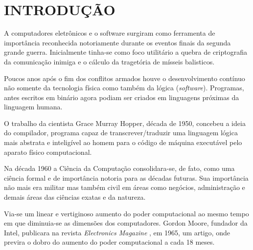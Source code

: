 


\section{\textbf{INTRODUÇÃO}}
    \label{sec:introdução}



    A computadores eletrônicos e o software surgiram como ferramenta de importância
    reconhecida notoriamente durante os eventos finais da segunda grande guerra.
    Inicialmente tinha-se como foco utilitário a quebra de criptografia
    da comunicação inimiga e o cálculo da tragetória de mísseis balisticos.
    
    Poucos anos após o fim dos conflitos armados houve o desenvolvimento contínuo
    não somente da tecnologia física como também da lógica (\textit{software}).
    Programas, antes escritos em binário agora podiam ser criados em linguagens
    próximas da linguagem humana.

    O trabalho da cientista Grace Murray Hopper, década de 1950,
    concebeu a ideia do compilador, programa capaz de transcrever/traduzir uma
    linguagem lógica mais abstrata e inteligível ao homem para o código de máquina
    executável pelo aparato físico computacional.

    Na década 1960 a Ciência da Computação consolidara-se, de fato, como uma ciência formal
    e de importância notoria para as décadas futuras. Sua importância não mais
    era militar mas também civil em áreas como negócios, administração e demais áreas das
    ciências exatas e da natureza.

    Via-se um linear e vertiginoso aumento do poder computacional ao mesmo tempo em
    que diminuia-se as dimensões dos computadores. Gordon Moore, fundador da Intel,
    publicara na revista \textit{ Electronics Magazine }, em 1965, um artigo, onde previra
    o dobro do aumento do poder computacional a cada 18 meses.

